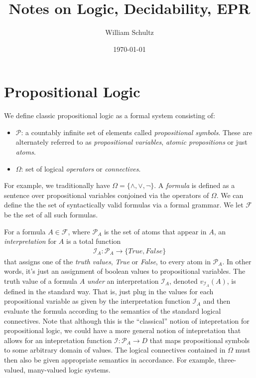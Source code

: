 \documentclass[10pt]{article}
\begin{document}
\title{Notes on Logic, Decidability, EPR}
\author{William Schultz}
\date{\today}

\maketitle
\tableofcontents

\newcommand{\propvars}{{\mathcal{P}}}
\newcommand{\A}{\forall}
\newcommand{\E}{\exists}

\section{Propositional Logic}

We define classic propositional logic \cite{2012benari} as a formal system consisting of: 
\begin{itemize}
    \item $\propvars$: a countably infinite set of elements called \textit{propositional symbols}. These are alternately referred to as \textit{propositional variables}, \textit{atomic propositions} or just \textit{atoms}.
    \item $\Omega$: set of logical \textit{operators} or \textit{connectives}.
\end{itemize}
For example, we traditionally have $\Omega=\{\wedge, \vee, \neg\}$. A \textit{formula} is defined as a sentence over propositional variables conjoined via the operators of $\Omega$. We can define the the set of syntactically valid formulas via a formal grammar. We let $\mathcal{F}$ be the set of all such formulas. 

\newcommand{\interp}{\mathcal{I}}

For a formula $A \in \mathcal{F}$, where $\propvars_A$ is the set of atoms that appear in $A$,  an \textit{interpretation} for $A$ is a total function
\begin{align*}
    \mathcal{I}_A : \propvars_A \rightarrow \{True,False\}
\end{align*}
that assigns one of the \textit{truth values}, \textit{True} or \textit{False}, to every atom in $\propvars_A$. In other words, it's just an assignment of boolean values to propositional variables.  The truth value of a formula $A$ \textit{under} an interpretation $\mathcal{I}_A$, denoted $v_{\mathcal{I}_{A}}(A)$, is defined in the standard way. That is, just plug in the values for each propositional variable as given by the interpretation function $\mathcal{I}_A$ and then evaluate the formula according to the semantics of the standard logical connectives. Note that although this is the ``classical'' notion of intepretation for propositional logic, we could have a more general notion of intepretation that allows for an intepretation function $\mathcal{I} : \mathcal{P}_A \rightarrow D$ that maps propositional symbols to some arbitrary domain of values. The logical connectives contained in $\Omega$ must then also be given appropriate semantics in accordance. For example, three-valued, many-valued logic systems. 
\end{document}
